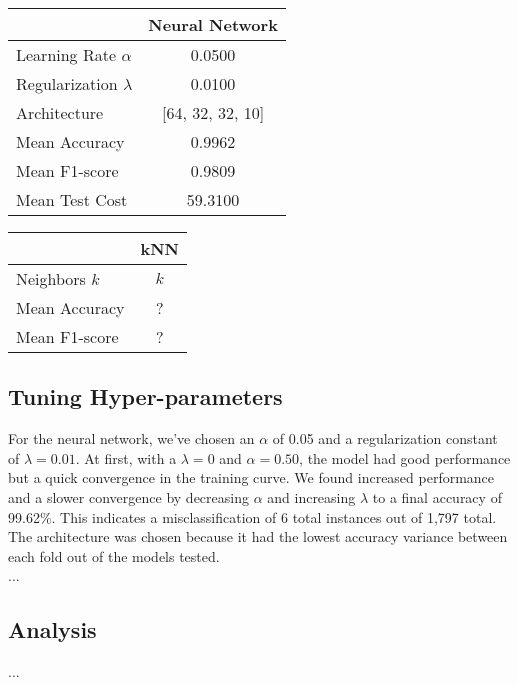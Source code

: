 \documentclass{article}
\begin{document}
\begin{minipage}{0.49\textwidth}
    \centering

    \begin{tabular}{lc}
        \toprule
         & Neural Network \\
        \midrule
        Learning Rate $\alpha$ & 0.0500 \\
        Regularization $\lambda$ & 0.0100 \\
        Architecture & [64, 32, 32, 10] \\
        Mean Accuracy & 0.9962 \\
        Mean F1-score & 0.9809 \\
        Mean Test Cost & 59.3100 \\
        \bottomrule
    \end{tabular}

\end{minipage}
    \hfill
\begin{minipage}{0.49\textwidth}
    \centering

    \begin{tabular}{lc}
    \toprule
     & kNN \\
    \midrule
    Neighbors $k$ & $k$ \\
    Mean Accuracy & ? \\
    Mean F1-score & ? \\
    \bottomrule
    \end{tabular}

\end{minipage}

\subsection*{Tuning Hyper-parameters}
For the neural network, we've chosen an $\alpha$ of 0.05 and a regularization constant of $\lambda=0.01$. At first, with a $\lambda=0$ and $\alpha=0.50$, the model had good performance but a quick convergence in the training curve.
We found increased performance and a slower convergence by decreasing $\alpha$ and increasing $\lambda$ to a final accuracy of 99.62\%. This indicates a misclassification of 6 total instances out of 1,797 total.
The architecture was chosen because it had the lowest accuracy variance between each fold out of the models tested.
\\

...

\subsection*{Analysis}
...
\end{document}
